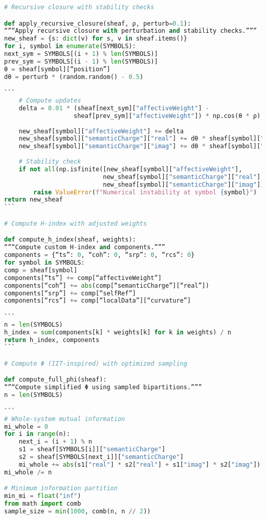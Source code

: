 \documentclass[11pt]{article}
\begin{document}
\begin{lstlisting}[language=Python, caption={EEG-LIGO Combined Analysis - Complete Code}]
# Recursive closure with stability checks

def apply_recursive_closure(sheaf, ρ, perturb=0.1):
“”“Apply recursive closure with perturbation and stability checks.”””
new_sheaf = {s: dict(v) for s, v in sheaf.items()}
for i, symbol in enumerate(SYMBOLS):
next_sym = SYMBOLS[(i + 1) % len(SYMBOLS)]
prev_sym = SYMBOLS[(i - 1) % len(SYMBOLS)]
θ = sheaf[symbol][“position”]
dθ = perturb * (random.random() - 0.5)

```
    # Compute updates
    delta = 0.01 * (sheaf[next_sym]["affectiveWeight"] - 
                   sheaf[prev_sym]["affectiveWeight"]) * np.cos(θ * ρ)
    
    new_sheaf[symbol]["affectiveWeight"] += delta
    new_sheaf[symbol]["semanticCharge"]["real"] += dθ * sheaf[symbol]["selfRef"]
    new_sheaf[symbol]["semanticCharge"]["imag"] += dθ * sheaf[symbol]["localData"]["curvature"]
    
    # Stability check
    if not all(np.isfinite([new_sheaf[symbol]["affectiveWeight"],
                           new_sheaf[symbol]["semanticCharge"]["real"],
                           new_sheaf[symbol]["semanticCharge"]["imag"]])):
        raise ValueError(f"Numerical instability at symbol {symbol}")
return new_sheaf
```

# Compute H-index with adjusted weights

def compute_h_index(sheaf, weights):
“”“Compute custom H-index and components.”””
components = {“ts”: 0, “coh”: 0, “srp”: 0, “rcs”: 0}
for symbol in SYMBOLS:
comp = sheaf[symbol]
components[“ts”] += comp[“affectiveWeight”]
components[“coh”] += abs(comp[“semanticCharge”][“real”])
components[“srp”] += comp[“selfRef”]
components[“rcs”] += comp[“localData”][“curvature”]

```
n = len(SYMBOLS)
h_index = sum(components[k] * weights[k] for k in weights) / n
return h_index, components
```

# Compute Φ (IIT-inspired) with optimized sampling

def compute_full_phi(sheaf):
“”“Compute simplified Φ using sampled bipartitions.”””
n = len(SYMBOLS)

```
# Whole-system mutual information
mi_whole = 0
for i in range(n):
    next_i = (i + 1) % n
    s1 = sheaf[SYMBOLS[i]]["semanticCharge"]
    s2 = sheaf[SYMBOLS[next_i]]["semanticCharge"]
    mi_whole += abs(s1["real"] * s2["real"] + s1["imag"] * s2["imag"])
mi_whole /= n

# Minimum information partition
min_mi = float("inf")
from math import comb
sample_size = min(1000, comb(n, n // 2))


\end{lstlisting}
\end{document}
